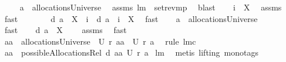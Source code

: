 \begin{isabellebody}
\ \isanewline
\ \ {}{\isacharcolon}\ {\isachardoublequoteopen}a\ {\isasymin}\ allocationsUniverse{\isachardoublequoteclose}\ \isamarkupfalse%
\ assms{\isacharparenleft}{}{\isacharparenright}\ lm{}{}\ \ set{\isacharunderscore}rev{\isacharunderscore}mp\ \isamarkupfalse%
\ blast\isanewline
\ \ \isamarkupfalse%
\ {\isachardoublequoteopen}i\ {\isasymnotin}\ X{\isachardoublequoteclose}\ \isamarkupfalse%
\ assms\ \isamarkupfalse%
\ fast\ \isamarkupfalse%
\ \isamarkupfalse%
\ \isanewline
\ \ {}{\isacharcolon}\ {\isachardoublequoteopen}{\isacharquery}d\ a\ {\isacharminus}\ X\ {\isasymunion}\ {\isacharbraceleft}i{\isacharbraceright}\ {\isacharequal}\ {\isacharquery}d\ a\ {\isasymunion}\ {\isacharbraceleft}i{\isacharbraceright}\ {\isacharminus}\ X{\isachardoublequoteclose}\ \isamarkupfalse%
\ fast\isanewline
\ \ \isamarkupfalse%
\ {\isachardoublequoteopen}a\ {\isasymin}\ allocationsUniverse{\isachardoublequoteclose}\ \isamarkupfalse%
\ {}\ \isamarkupfalse%
\ fast\ \isamarkupfalse%
\ \isamarkupfalse%
\ {\isachardoublequoteopen}{\isacharquery}d\ a\ {\isasyminter}\ X\ {\isasymnoteq}\ {\isacharbraceleft}{\isacharbraceright}{\isachardoublequoteclose}\ \isamarkupfalse%
\ assms\ \isamarkupfalse%
\ fast\ \isanewline
\ \ \isamarkupfalse%
\ \isamarkupfalse%
\ {\isachardoublequoteopen}{\isacharquery}aa\ {\isasymin}\ allocationsUniverse\ {\isacharampersand}\ {\isacharquery}U\ {\isacharparenleft}{\isacharquery}r\ {\isacharquery}aa{\isacharparenright}\ {\isacharequal}\ {\isacharquery}U\ {\isacharparenleft}{\isacharquery}r\ a{\isacharparenright}{\isachardoublequoteclose}\ \isamarkupfalse%
\ {\isacharparenleft}rule\ lm{}{}c{\isacharparenright}\ \isamarkupfalse%
\isanewline
\ \ \isamarkupfalse%
\ \isamarkupfalse%
\ {\isachardoublequoteopen}{\isacharquery}aa\ {\isasymin}\ possibleAllocationsRel\ {\isacharparenleft}{\isacharquery}d\ {\isacharquery}aa{\isacharparenright}\ {\isacharparenleft}{\isacharquery}U\ {\isacharparenleft}{\isacharquery}r\ a{\isacharparenright}{\isacharparenright}{\isachardoublequoteclose}\isanewline
{}\isamarkupfalse%
\ lm{}{}\ \isamarkupfalse%
\ {\isacharparenleft}metis\ {\isacharparenleft}lifting{\isacharcomma}\ mono{\isacharunderscore}tags{\isacharparenright}{\isacharparenright}\isanewline

\end{isabellebody}
